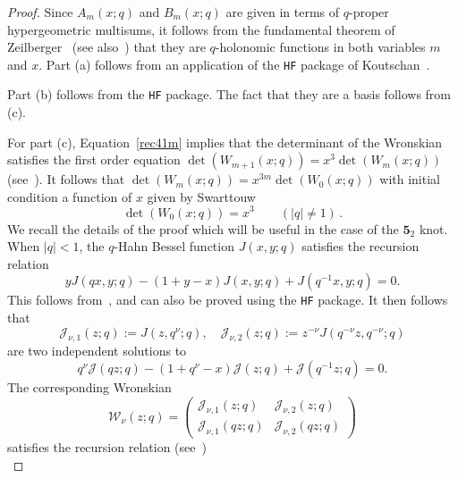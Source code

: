 \documentclass[12pt,reqno]{amsart}
\theoremstyle{definition}
\def\md{\mathbf}
\def\cJ{\mathcal{J}}
\def\cW{\mathcal{W}}
\newcommand{\knot}[1]{\md{#1}}
\begin{document}
\begin{proof}
  Since $A_m(x;q)$ and $B_m(x;q)$ are given in terms of $q$-proper
  hypergeometric multisums, it follows from the fundamental theorem of
  Zeilberger~\cite{Zeil:holo,WZ,PWZ} (see also~\cite{GL:survey}) that
  they are $q$-holonomic functions in both variables $m$ and $x$.
  Part (a) follows from an application of the \texttt{HF} package of
  Koutschan~\cite{Koutschan, Koutschan:holofunctions}.

  Part (b) follows from the \texttt{HF} package. The
  fact that they are a basis follows from (c).

  For part (c), Equation~\eqref{rec41m} implies that the determinant of
  the Wronskian satisfies the first order
  equation $\det(W_{m+1}(x;q))=x^3\det(W_{m}(x;q))$
  (see~\cite[Lem.4.7]{GK:74}). It follows that
  $\det(W_m(x;q))=x^{3m}\det(W_0(x;q))$ with initial condition a
  function of $x$ given by Swarttouw~\cite{MR2714507} 
  \begin{equation}
    \label{W4100}
    \det(W_0(x;q)) = x^3 
    \qquad
    (|q| \neq 1) \,.
  \end{equation}
  We recall the details of the proof which will be useful in the case
  of the $\knot{5}_2$ knot.  When $|q|<1$, the $q$-Hahn Bessel function
  $J(x,y;q)$ satisfies the recursion relation
  \begin{equation}
    y J(qx,y;q) - (1+y-x)J(x,y;q) + J(q^{-1}x,y;q) = 0.
    \label{eq:J-rec1}
  \end{equation}
  This follows from~\cite{MR2714507}, and can also be proved
  using the \texttt{HF} package. It then follows that
  \begin{equation}
    \cJ_{\nu,1}(z;q) := J(z,q^\nu;q), \quad
    \cJ_{\nu,2}(z;q) := z^{-\nu}J(q^{-\nu}z,q^{-\nu};q)
  \end{equation}
  are two independent solutions to
  \begin{equation}
    q^\nu \cJ(qz;q) - (1+q^\nu-x)\cJ(z;q) + \cJ(q^{-1}z;q) = 0.
  \end{equation}
  The corresponding Wronskian
  \begin{equation}
    \cW_\nu(z;q) =
    \begin{pmatrix}
      \cJ_{\nu,1}(z;q) & \cJ_{\nu,2}(z;q)\\
      \cJ_{\nu,1}(qz;q) & \cJ_{\nu,2}(qz;q)
    \end{pmatrix}
  \end{equation}
  satisfies the recursion relation (see~\cite[Lem.4.7]{GK:74})
  \begin{equation}

\end{equation}
\end{proof}
\end{document}
